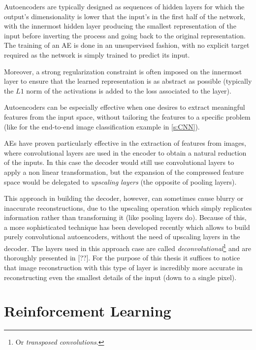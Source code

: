 Autoencoders are typically designed as sequences of hidden layers for which 
the output's dimensionality is lower that the input's in the first half of the 
network, with the innermost hidden layer producing the smallest representation 
of the input before inverting the process and going back to the original 
representation. 
The training of an AE is done in an unsupervised fashion, with no
explicit target required as the network is simply trained to predict its input.

Moreover, a strong regularization constraint is often imposed on the innermost 
layer to ensure that the learned representation is as abstract as possible 
(typically the $L1$ norm of the activations is added to the loss associated to 
the layer). 

Autoencoders can be especially effective when one desires to extract meaningful
features from the input space, without tailoring the features to a specific 
problem (like for the end-to-end image classification example in \ref{s:CNN}). 

AEs have proven particularly effective in the extraction of features 
from images, where convolutional layers are used in the encoder to obtain a 
natural reduction of the inputs. In this case the decoder would still use 
convolutional layers to apply a non linear transformation, but the expansion
of the compressed feature space would be delegated to \textit{upscaling layers}
(the opposite of pooling layers). 

This approach in building the decoder, however, can sometimes cause blurry
or inaccurate reconstructions, due to the upscaling operation which simply 
replicates information rather than transforming it (like pooling layers do).
Because of this, a more sophisticated technique has been developed recently 
which allows to build purely convolutional autoencoders, without the need of 
upscaling layers in the decoder.
The layers used in this approach case are called \textit{deconvolutional}\footnote{Or
\textit{transposed convolutions}.} and are thoroughly presented in [??]. 
For the purpose of this thesis it suffices to notice that image reconstruction 
with this type of layer is incredibly more accurate in reconstructing even the 
smallest details of the input (down to a single pixel).

\section{Reinforcement Learning} \label{s:DRL}

